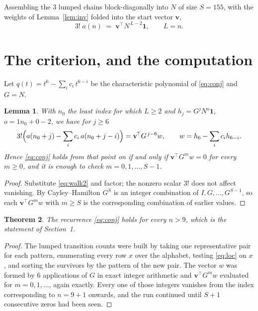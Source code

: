 \documentclass[11pt,a4paper]{article}
\theoremstyle{plain}
\newtheorem{theorem}{Theorem}
\newtheorem{lemma}[theorem]{Lemma}
\theoremstyle{definition}
\begin{document}
Assembling the $3$ lumped chains block-diagonally into $N$ of size $S=155$, with the
weights of Lemma~\ref{lem:inv} folded into the start vector $\mathbf{v}$,
\begin{equation}\label{eq:walk2}
3!\;a(n)\;=\;\mathbf{v}^{\!\top}N^{\,L-2}\mathbf{1},\qquad L=n .
\end{equation}

\section{The criterion, and the computation}

Let $q(t)=t^{6}-\sum_i c_i\,t^{6-i}$ be the characteristic polynomial of
\eqref{eq:conj} and $G=N$.

\begin{lemma}\label{lem:crit}
With $n_0$ the least index for which $L\ge2$ and $h_j=G^{j}N^{o}\mathbf{1}$,
$o=1n_0+0-2$, we have for $j\ge6$
\[
3!\Bigl(a(n_0+j)-\sum_i c_i\,a(n_0+j-i)\Bigr)
=\mathbf{v}^{\!\top}G^{\,j-6}w,\qquad
w=h_{6}-\sum_i c_i h_{6-i} .
\]
Hence \eqref{eq:conj} holds from that point on if and only if
$\mathbf{v}^{\!\top}G^{m}w=0$ for every $m\ge0$, and it is enough to check
$m=0,1,\dots,S-1$.
\end{lemma}

\begin{proof}
Substitute \eqref{eq:walk2} and factor; the nonzero scalar $3!$ does not affect
vanishing. By Cayley--Hamilton $G^{S}$ is an integer combination of $I,G,\dots,G^{S-1}$,
so each $\mathbf{v}^{\!\top}G^{m}w$ with $m\ge S$ is the corresponding combination of
earlier values.
\end{proof}

\begin{theorem}
The recurrence \eqref{eq:conj} holds for every $n>9$, which is the statement of
Section~1.
\end{theorem}

\begin{proof}
The lumped transition counts were built by taking one representative pair for each pattern,
enumerating every row $x$ over the alphabet, testing \eqref{eq:loc} on $x$, and sorting
the survivors by the pattern of the new pair. The vector $w$ was formed by $6$
applications of $G$ in exact integer arithmetic and $\mathbf{v}^{\!\top}G^{m}w$
evaluated for $m=0,1,\dots$, again exactly. Every one of those integers vanishes from the
index corresponding to $n=9+1$ onwards, and the run continued until $S+1$ consecutive
zeros had been seen.
\end{proof}
\end{document}
